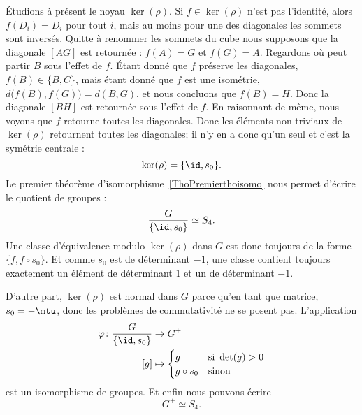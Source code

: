 Étudions à présent le noyau \( \ker(\rho)\). Si \( f\in\ker(\rho)\) n'est pas l'identité, alors \( f(D_i)=D_i\) pour tout \( i\), mais au moins pour une des diagonales les sommets sont inversés. Quitte à renommer les sommets du cube nous supposons que la diagonale \( [AG]\) est retournée : \( f(A)=G\) et \( f(G)=A\). Regardons où peut partir \( B\) sous l'effet de \( f\). Étant donné que \( f\) préserve les diagonales, \( f(B)\in\{ B,C \}\), mais étant donné que \( f\) est une isométrie, \( d\big( f(B),f(G) \big)=d(B,G)\), et nous concluons que \( f(B)=H\). Donc la diagonale \( [BH]\) est retournée sous l'effet de \( f\). En raisonnant de même, nous voyons que \( f\) retourne toutes les diagonales. Donc les éléments non triviaux de \( \ker(\rho)\) retournent toutes les diagonales; il n'y en a donc qu'un seul et c'est la symétrie centrale :
\begin{equation}
	\ker(\rho)=\{ \id,s_0 \}.
\end{equation}
Le premier théorème d'isomorphisme~\ref{ThoPremierthoisomo} nous permet d'écrire le quotient de groupes :
\begin{equation}
	\frac{ G }{ \{ \id,s_0 \} }\simeq S_4.
\end{equation}
Une classe d'équivalence modulo \( \ker(\rho)\) dans \( G\) est donc toujours de la forme \( \{ f,f\circ s_0 \}\). Et comme \( s_0\) est de déterminant \( -1\), une classe contient toujours exactement un élément de déterminant \( 1\) et un de déterminant \( -1\).

D'autre part, \( \ker(\rho)\) est normal dans \( G\) parce qu'en tant que matrice, \( s_0=-\mtu\), donc les problèmes de commutativité ne se posent pas. L'application
\begin{equation}
	\begin{aligned}
		\varphi\colon \frac{ G }{ \{ \id,s_0 \} } & \to G^+                                   \\
		[g]                                       & \mapsto \begin{cases}
			                                                    g          & \text{si } \det(g)>0 \\
			                                                    g\circ s_0 & \text{sinon}
		                                                    \end{cases}
	\end{aligned}
\end{equation}
est un isomorphisme de groupes. Et enfin nous pouvons écrire
\begin{equation}
	G^+\simeq S_4.
\end{equation}

